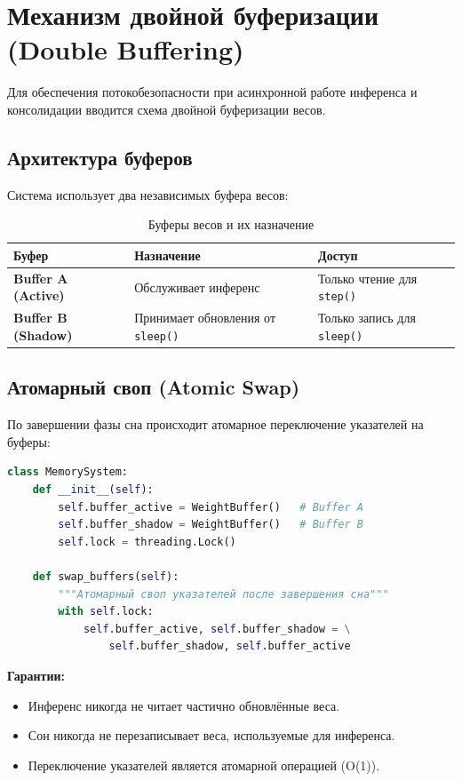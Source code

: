 \section{Механизм двойной буферизации (Double Buffering)}

Для обеспечения потокобезопасности при асинхронной работе инференса и консолидации вводится схема двойной буферизации весов.

\subsection{Архитектура буферов}

Система использует два независимых буфера весов:

\begin{table}[h]
\centering
\caption{Буферы весов и их назначение}
\label{tab:buffers}
\begin{tabular}{lp{5cm}p{4cm}}
\toprule
\textbf{Буфер} & \textbf{Назначение} & \textbf{Доступ} \\
\midrule
\textbf{Buffer A (Active)} & Обслуживает инференс & Только чтение для \texttt{step()} \\
\textbf{Buffer B (Shadow)} & Принимает обновления от \texttt{sleep()} & Только запись для \texttt{sleep()} \\
\bottomrule
\end{tabular}
\end{table}

\subsection{Атомарный своп (Atomic Swap)}

По завершении фазы сна происходит атомарное переключение указателей на буферы:

\begin{lstlisting}[language=Python, caption={Атомарный своп буферов}, label={lst:buffer_swap}]
class MemorySystem:
    def __init__(self):
        self.buffer_active = WeightBuffer()   # Buffer A
        self.buffer_shadow = WeightBuffer()   # Buffer B
        self.lock = threading.Lock()

    def swap_buffers(self):
        """Атомарный своп указателей после завершения сна"""
        with self.lock:
            self.buffer_active, self.buffer_shadow = \
                self.buffer_shadow, self.buffer_active
\end{lstlisting}

\textbf{Гарантии:}
\begin{itemize}
    \item Инференс никогда не читает частично обновлённые веса.
    \item Сон никогда не перезаписывает веса, используемые для инференса.
    \item Переключение указателей является атомарной операцией (O(1)).
\end{itemize}

